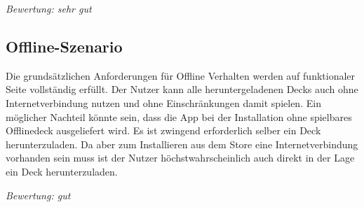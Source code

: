 \vspace{5mm}
\emph{Bewertung: sehr gut}
\vspace{5mm}

\subsection{Offline-Szenario}
Die grundsätzlichen Anforderungen für Offline Verhalten werden auf funktionaler Seite vollständig erfüllt. Der Nutzer kann alle heruntergeladenen Decks auch ohne Internetverbindung nutzen und ohne Einschränkungen damit spielen. Ein möglicher Nachteil könnte sein, dass die App bei der Installation ohne spielbares Offlinedeck ausgeliefert wird. Es ist zwingend erforderlich selber ein Deck herunterzuladen. Da aber zum Installieren aus dem Store eine Internetverbindung vorhanden sein muss ist der Nutzer höchstwahrscheinlich auch direkt in der Lage ein Deck herunterzuladen. 

\vspace{5mm}
\emph{Bewertung: gut}
\vspace{5mm}

